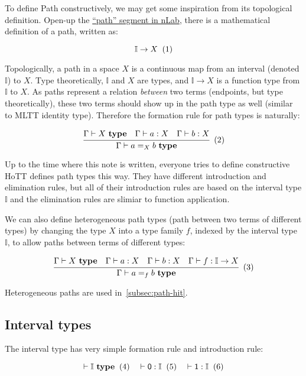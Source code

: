 To define Path constructively,
we may get some inspiration from its topological definition.
Open-up the \href{https://ncatlab.org/nlab/show/path}{``path'' segment in nLab},
there is a mathematical definition of a path, written as:

\[
  \mathbb I \rightarrow X
  \xtag
\]

Topologically, a path in a space $X$ is a continuous map
from an interval (denoted $\mathbb I$) to $X$.
Type theoretically, $\mathbb I$ and $X$ are types,
and $\mathbb I \rightarrow X$ is a function type from $\mathbb I$ to $X$.
As paths represent a relation \textit{between} two terms
(endpoints, but type theoretically),
these two terms should show up in the path type as well
(similar to MLTT identity type).
Therefore the formation rule for path types is naturally:

\[
  \cfrac{
    \Gamma \vdash X \ \textbf{type}
    \quad
    \Gamma \vdash a : X
    \quad
    \Gamma \vdash b : X
  }{\Gamma \vdash a =_X b \ \textbf{type}}
  \xtag
\]

Up to the time where this note is written,
everyone tries to define constructive HoTT defines path types this way.
They have different introduction and elimination rules,
but all of their introduction rules are
based on the interval type $\mathbb I$
and the elimination rules are slimiar to function application.

We can also define heterogeneous path types
(path between two terms of different types)
by changing the type $X$ into a type family $f$,
indexed by the interval type $\mathbb I$,
to allow paths between terms of different types:

\[
  \cfrac{
    \Gamma \vdash X \ \textbf{type}
    \quad
    \Gamma \vdash a : X
    \quad
    \Gamma \vdash b : X
    \quad
    \Gamma \vdash f : \mathbb I \rightarrow X
  }{\Gamma \vdash a =_f b \ \textbf{type}}
  \xtag \label{eqn:hetero-path}
\]

Heterogeneous paths are used in~\cref{subsec:path-hit}.

\subsection{Interval types}

The interval type has very simple formation rule
and introduction rule:

\[
  \vdash \mathbb I\ \textbf{type}
  \xtag \quad
  \vdash \textsf 0 : \mathbb I
  \xtag \quad
  \vdash \textsf 1 : \mathbb I
  \xtag
\]

